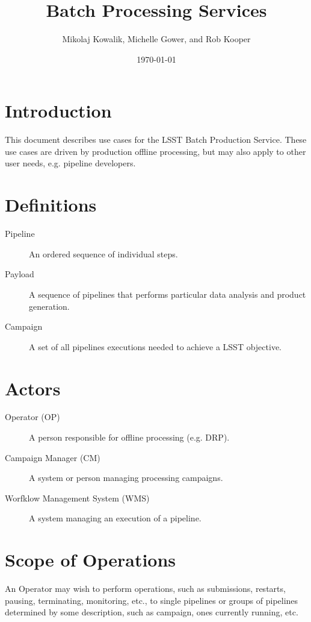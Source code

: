 \documentclass[DM,lsstdraft,toc]{lsstdoc}
\title{Batch Processing Services}
\author{Mikolaj Kowalik, Michelle Gower, and Rob Kooper}
\date{\today}
\begin{document}
\maketitle

\section{Introduction}

This document describes use cases for the LSST Batch Production Service.  These
use cases are driven by production offline processing, but may also apply to
other user needs, e.g. pipeline developers.

\section{Definitions}

\begin{description}
  \item[Pipeline] 
    An ordered sequence of individual steps.
  \item[Payload]
    A sequence of pipelines that performs particular data analysis and product
    generation.
  \item[Campaign]
    A set of all pipelines executions needed to achieve a LSST objective.
\end{description}

\section{Actors}

\begin{description}
  \item[Operator (OP)]
    A person responsible for offline processing (e.g. DRP).

  \item[Campaign Manager (CM)]
    A system or person managing processing campaigns.

  \item[Worfklow Management System (WMS)]
    A system managing an execution of a pipeline.
\end{description}

\section{Scope of Operations}
An Operator may wish to perform operations, such as submissions, restarts,
pausing, terminating, monitoring, etc., to single pipelines or groups of
pipelines determined by some description, such as campaign, ones currently
running, etc.
\end{document}
